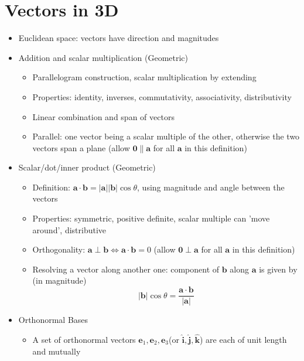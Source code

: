 \section{Vectors in 3D}
\begin{itemize}
      \item Euclidean space: vectors have direction and magnitudes
      \item Addition and scalar multiplication (Geometric)
            \begin{itemize}
                  \item Parallelogram construction, scalar multiplication by extending
                  \item Properties: identity, inverses, commutativity, associativity, distributivity
                  \item Linear combination and span of vectors
                  \item Parallel: one vector being a scalar multiple of the other, otherwise
                        the two vectors span a plane (allow $\mathbf{0\parallel a}$ for all
                        $\mathbf{a}$ in this definition)
            \end{itemize}
      \item Scalar/dot/inner product (Geometric)
            \begin{itemize}
                  \item Definition: $\mathbf{a\cdot b}=|\mathbf{a}||\mathbf{b}|\cos\theta$,
                        using magnitude and angle between the vectors
                  \item Properties: symmetric, positive definite, scalar multiple can 'move
                        around', distributive
                  \item Orthogonality: $\mathbf{a\perp b}\iff\mathbf{a\cdot b}=0$ (allow
                        $\mathbf{0\perp a}$ for all $\mathbf{a}$ in this definition)
                  \item Resolving a vector along another one: component of $\mathbf{b}$ along $\mathbf{a}$ is given by (in magnitude)
                        \[\mathbf{|b|}\cos\theta=\mathbf{\frac{a\cdot b}{|a|}} \]
            \end{itemize}
      \item Orthonormal Bases
            \begin{itemize}
                  \item A set of orthonormal vectors $\mathbf{e}_{1},\mathbf{e}_{2},\mathbf{e}_{3}$(or
                        $\mathbf{\hat{i},\hat{j},\hat{k}}$) are each of unit length and mutually

\end{itemize}
\end{itemize}
